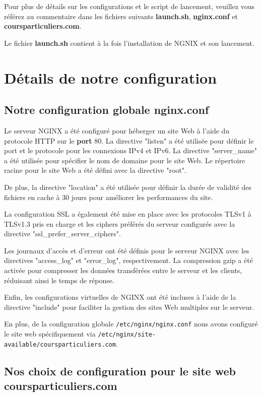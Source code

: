 \documentclass{article}
\begin{document}
Pour plus de détails sur les configurations et le script de lancement, veuillez vous référez au commentaire dans les fichiers suivants \textbf{launch.sh}, \textbf{nginx.conf} et \textbf{coursparticuliers.com}.

Le fichier \textbf{launch.sh} contient à la fois l'installation de NGNIX et son lancement.


\section{Détails de notre configuration}

\subsection{Notre configuration globale nginx.conf}

Le serveur NGINX a été configuré pour héberger un site Web à l'aide du protocole HTTP sur le \textbf{port} 80. La directive "listen" a été utilisée pour définir le port et le protocole pour les connexions IPv4 et IPv6. La directive "server\_name" a été utilisée pour spécifier le nom de domaine pour le site Web. Le répertoire racine pour le site Web a été défini avec la directive "root".

De plus, la directive "location" a été utilisée pour définir la durée de validité des fichiers en cache à 30 jours pour améliorer les performances du site.

La configuration SSL a également été mise en place avec les protocoles TLSv1 à TLSv1.3 pris en charge et les ciphers préférés du serveur configurés avec la directive "ssl\_prefer\_server\_ciphers".

Les journaux d'accès et d'erreur ont été définis pour le serveur NGINX avec les directives "access\_log" et "error\_log", respectivement. La compression gzip a été activée pour compresser les données transférées entre le serveur et les clients, réduisant ainsi le temps de réponse.

Enfin, les configurations virtuelles de NGINX ont été incluses à l'aide de la directive "include" pour faciliter la gestion des sites Web multiples sur le serveur.

En plus, de la configuration globale \texttt{/etc/nginx/nginx.conf} nous avons configuré le site web spécifiquement via \texttt{/etc/nginx/site-available/coursparticuliers.com}.

\subsection{Nos choix de configuration pour le site web coursparticuliers.com}
\end{document}
